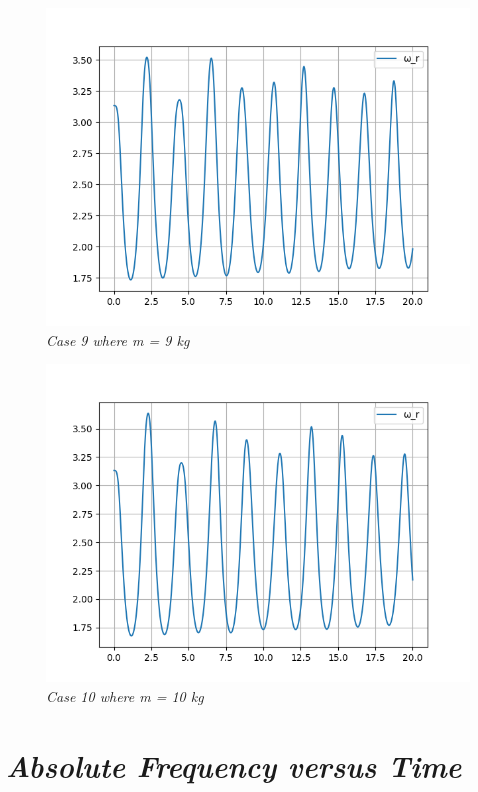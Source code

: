         \begin{figure}[H]
            \centering
            \includegraphics{Appendix/RSimPictures/F/fm9.png}
            \caption{\textit{Case 9 where m = 9 kg}}
            \label{}
        \end{figure}
            
        \begin{figure}[H]
            \centering
            \includegraphics{Appendix/RSimPictures/F/fm10.png}
            \caption{\textit{Case 10 where m = 10 kg}}
            \label{}
        \end{figure}
            
    \section{\textit{Absolute Frequency versus Time}}
            
